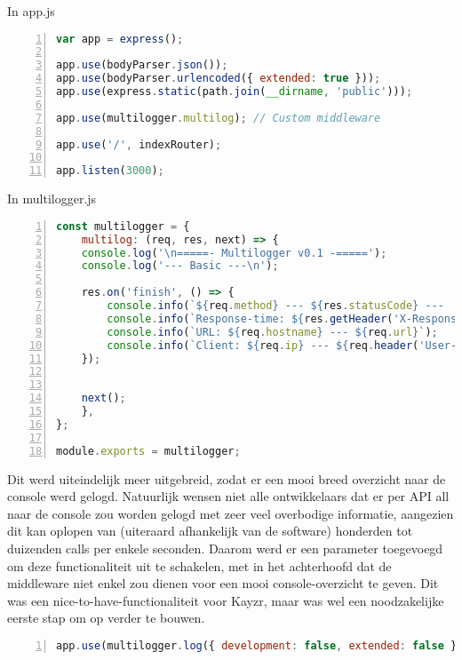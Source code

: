In app.js
\begin{lstlisting}[language=JavaScript, breaklines=true, numbers=left, frame=single, caption={app.js eerste stap},label=code:appjsFirst]
var app = express();

app.use(bodyParser.json());
app.use(bodyParser.urlencoded({ extended: true }));
app.use(express.static(path.join(__dirname, 'public')));

app.use(multilogger.multilog); // Custom middleware

app.use('/', indexRouter);

app.listen(3000);
\end{lstlisting}

In multilogger.js
\begin{lstlisting}[language=JavaScript, breaklines=true, numbers=left, frame=single, caption={multilogger.js eerste stap},label=code:multilogFirst]
const multilogger = {
	multilog: (req, res, next) => {
	console.log('\n=====- Multilogger v0.1 -=====');
	console.log('--- Basic ---\n');
	
	res.on('finish', () => {
		console.info(`${req.method} --- ${res.statusCode} ---  ${res.statusMessage}  at ${new Date().toLocaleString()}`);
		console.info(`Response-time: ${res.getHeader('X-Response-Time')}`);
		console.info(`URL: ${req.hostname} --- ${req.url}`);
		console.info(`Client: ${req.ip} --- ${req.header('User-Agent')}`);
	});
	

	next();
	},
};

module.exports = multilogger; 
\end{lstlisting}

Dit werd uiteindelijk meer uitgebreid, zodat er een mooi breed overzicht naar de console werd gelogd. Natuurlijk wensen niet alle ontwikkelaars dat er per API all naar de console zou worden gelogd met zeer veel overbodige informatie, aangezien dit kan oplopen van (uiteraard afhankelijk van de software) honderden tot duizenden calls per enkele seconden. Daarom werd er een parameter toegevoegd om deze functionaliteit uit te schakelen, met in het achterhoofd dat de middleware niet enkel zou dienen voor een mooi console-overzicht te geven. Dit was een nice-to-have-functionaliteit voor Kayzr, maar was wel een noodzakelijke eerste stap om op verder te bouwen.

\begin{lstlisting}[language=JavaScript, breaklines=true, numbers=left, frame=single, caption={Parameters toegevoegd},label=code:multilogparams]
app.use(multilogger.log({ development: false, extended: false }));
\end{lstlisting}

